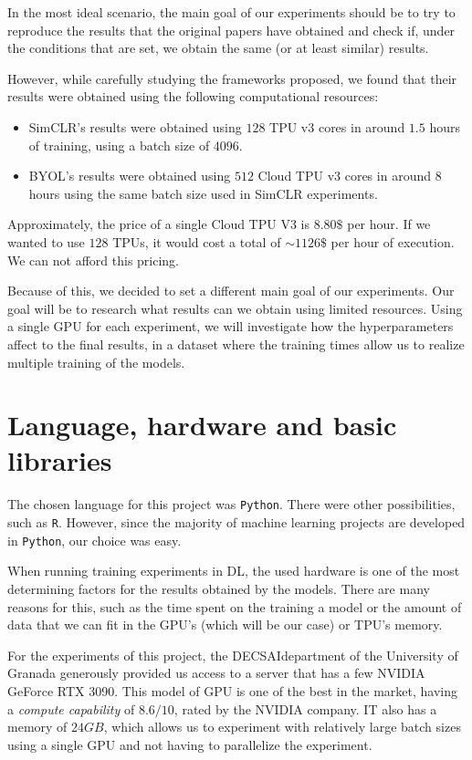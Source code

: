 In the most ideal scenario, the main goal of our experiments should be to try to reproduce the results that the original papers have obtained and check if, under the conditions that are set, we obtain the same (or at least similar) results.

However, while carefully studying the frameworks proposed, we found that their results were obtained using the following computational resources:
\begin{itemize}
\item SimCLR's results were obtained using $128$ TPU v3 cores in around $1.5$ hours of training, using a batch size of $4096$.
\item BYOL's results were obtained using $512$ Cloud TPU v3 cores in around $8$ hours using the same batch size used in SimCLR experiments.
\end{itemize}

Approximately, the price of a single Cloud TPU V3 is $8.80\$$ per hour. If we wanted to use $128$ TPUs, it would cost a total of $\sim 1126 \$$  per hour of execution. We can not afford this pricing. 

Because of this, we decided to set a different main goal of our experiments. Our goal will be to research what results can we obtain using limited resources. Using a single GPU for each experiment, we will investigate how the hyperparameters affect to the final results, in a dataset where the training times allow us to realize multiple training of the models.


\section{Language, hardware and basic libraries}

The chosen language for this project was \lstinline{Python}. There were other possibilities, such as \lstinline{R}. However, since the majority of machine learning projects are developed in \lstinline{Python}, our choice was easy.

When running training experiments in DL, the used hardware is one of the most determining factors for the results obtained by the models. There are many reasons for this, such as the time spent on the training a model or the amount of  data that we can fit in the GPU's (which will be our case) or TPU's memory.

For the experiments of this project, the DECSAI\footnotemark department of the University of Granada generously provided us access to a server that has a few NVIDIA GeForce RTX 3090. This model of GPU is one of the best in the market, having a \emph{compute capability} of $8.6/10$, rated by the NVIDIA company. IT also has a memory of $24GB$, which allows us to experiment with relatively large batch sizes using a single GPU and not having to parallelize the experiment.

